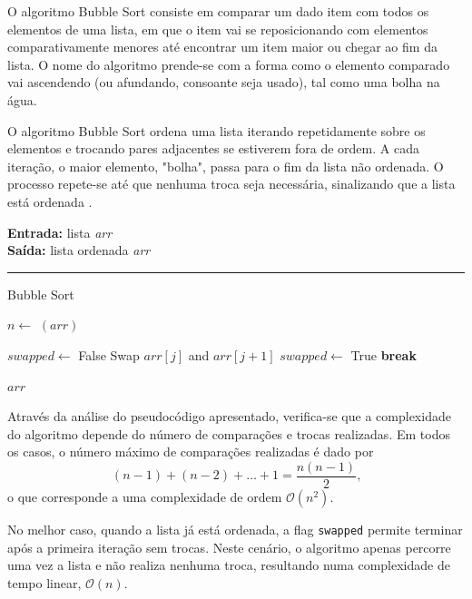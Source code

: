 \documentclass[conference]{IEEEtran}
\begin{document}
O algoritmo Bubble Sort consiste em comparar um dado item com todos os elementos de uma lista, em que o item vai se reposicionando com elementos comparativamente menores até encontrar um item maior ou chegar ao fim da lista. O nome do algoritmo prende-se com a forma como o elemento comparado vai ascendendo (ou afundando, consoante seja usado), tal como uma bolha na água. 

O algoritmo Bubble Sort ordena uma lista iterando repetidamente sobre os elementos e trocando pares adjacentes se estiverem fora de ordem. A cada iteração, o maior elemento, "bolha", passa para o fim da lista não ordenada. O processo repete-se até que nenhuma troca seja necessária, sinalizando que a lista está ordenada \cite{asthana2016bubble}.

\begin{algorithm}[H]
    \raggedright
    \vspace{.1em}
    \textbf{Entrada:} lista \textit{arr} \\
    \textbf{Saída:} lista ordenada \textit{arr} \\
    \vspace{.5em}
    \hrule 
    \caption{Bubble Sort}
    \begin{algorithmic}[1]
        \State $n \gets$ $(arr)$
        
            \State $swapped \gets$ False
                    \State Swap $arr[j]$ and $arr[j+1]$
                    \State $swapped \gets$ True
                \EndIf
            \EndFor
                \State \textbf{break}
            \EndIf
        \EndFor
    
        \State \Return $arr$
    \end{algorithmic}
\end{algorithm}

Através da análise do pseudocódigo apresentado, verifica-se que a complexidade do algoritmo depende do número de comparações e trocas realizadas. Em todos os casos, o número máximo de comparações realizadas é dado por
\[
(n - 1) + (n - 2) + \ldots + 1 = \frac{n(n - 1)}{2} \text{,}
\]
o que corresponde a uma complexidade de ordem \(\mathcal{O}(n^2)\).

No melhor caso, quando a lista já está ordenada, a flag \texttt{swapped} permite terminar após a primeira iteração sem trocas. Neste cenário, o algoritmo apenas percorre uma vez a lista e não realiza nenhuma troca, resultando numa complexidade de tempo linear, $\mathcal{O}(n)$.
\end{document}
